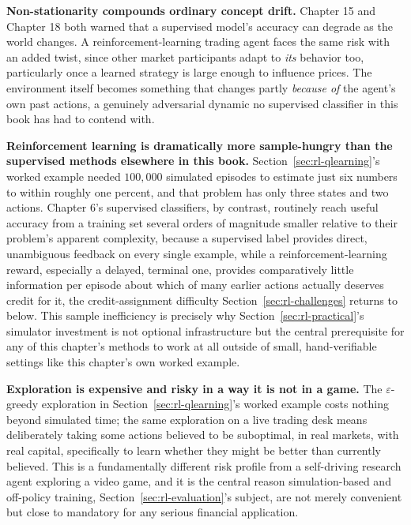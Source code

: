 \documentclass[../ai_in_finance]{subfiles}
\begin{document}
\textbf{Non-stationarity compounds ordinary concept drift.} Chapter 15 and Chapter 18 both warned that a supervised model's accuracy can degrade as the world changes. A reinforcement-learning trading agent faces the same risk with an added twist, since other market participants adapt to \emph{its} behavior too, particularly once a learned strategy is large enough to influence prices. The environment itself becomes something that changes partly \emph{because of} the agent's own past actions, a genuinely adversarial dynamic no supervised classifier in this book has had to contend with.

\textbf{Reinforcement learning is dramatically more sample-hungry than the supervised methods elsewhere in this book.} Section~\ref{sec:rl-qlearning}'s worked example needed $100{,}000$ simulated episodes to estimate just six numbers to within roughly one percent, and that problem has only three states and two actions. Chapter 6's supervised classifiers, by contrast, routinely reach useful accuracy from a training set several orders of magnitude smaller relative to their problem's apparent complexity, because a supervised label provides direct, unambiguous feedback on every single example, while a reinforcement-learning reward, especially a delayed, terminal one, provides comparatively little information per episode about which of many earlier actions actually deserves credit for it, the credit-assignment difficulty Section~\ref{sec:rl-challenges} returns to below. This sample inefficiency is precisely why Section~\ref{sec:rl-practical}'s simulator investment is not optional infrastructure but the central prerequisite for any of this chapter's methods to work at all outside of small, hand-verifiable settings like this chapter's own worked example.

\textbf{Exploration is expensive and risky in a way it is not in a game.} The $\varepsilon$-greedy exploration in Section~\ref{sec:rl-qlearning}'s worked example costs nothing beyond simulated time; the same exploration on a live trading desk means deliberately taking some actions believed to be suboptimal, in real markets, with real capital, specifically to learn whether they might be better than currently believed. This is a fundamentally different risk profile from a self-driving research agent exploring a video game, and it is the central reason simulation-based and off-policy training, Section~\ref{sec:rl-evaluation}'s subject, are not merely convenient but close to mandatory for any serious financial application.
\end{document}
